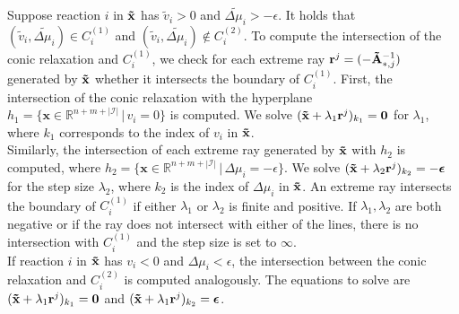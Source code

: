\newpage
Suppose reaction $i$ in $\bold{\tilde x}$ has $\tilde v_i >0$ and $\tilde{\Delta \mu_i} >- \epsilon$. It holds that $(\tilde v_i, \tilde{\Delta \mu_i}) \in C_i^{(1)}$ and $(\tilde v_i, \tilde{\Delta \mu_i}) \not \in C_i^{(2)}$. %
To compute the intersection of the conic relaxation and $C_i^{(1)}$, we check for each extreme ray $\mathbf r^j = (- \bold{\tilde A}^{-1}_{*,j})$ generated by $\bold{\tilde x}$ whether it intersects the boundary of $C_i^{(1)}$. 
First, the intersection of the conic relaxation with the hyperplane $h_1 = \{\mathbf x \in \mathbb{R}^{n + m + |\mathcal{I}|} \, | \, v_i = 0 \} $ is computed. We solve $(\bold{\tilde x} + \lambda_1 \mathbf r^j)_{k_1} = \mathbf 0$ for $\lambda_1$, where $k_1$ corresponds to the index of $v_i$ in $\bold{\tilde x}$. \\
Similarly, the intersection of each extreme ray generated by $\bold{\tilde x}$ with $h_2$ is computed, where $h_2 = \{\mathbf x \in \mathbb{R}^{n + m + |\mathcal{I}|} \, | \, \Delta \mu_i = -\epsilon \}$. We solve $(\bold{\tilde x} + \lambda_2 \mathbf r^j)_{k_2} = -\boldsymbol \epsilon$ for the step size $\lambda_2$, where $k_2$ is the index of $\Delta \mu_i$ in $\bold{\tilde x}$. 
An extreme ray intersects the boundary of $C_i^{(1)}$ if either $\lambda_1$ or $\lambda_2$ is finite and positive. If $\lambda_1, \lambda_2$ are both negative or if the ray does not intersect with either of the lines, there is no intersection with $C_i^{(1)}$ and the step size is set to $\infty$. \\
If reaction $i$ in $\bold{\tilde x}$ has $v_i <0$ and $\Delta \mu_i < \epsilon$, the intersection between the conic relaxation and $C_i^{(2)}$ is computed analogously. The equations to solve are $(\bold{\tilde x} + \lambda_1 \mathbf r^j)_{k_1} = \mathbf 0$ and $(\bold{\tilde x} + \lambda_1 \mathbf r^j)_{k_2} = \boldsymbol \epsilon$.
\vspace*{-\baselineskip}

